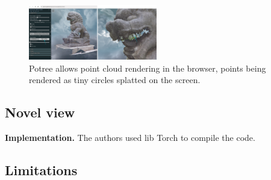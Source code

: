 
\begin{figure}[htbp]
    \centering
    \includegraphics[width=0.5\textwidth]{figures/potree_rendering_and_splat.png}
    \caption{Potree \cite{potree} allows point cloud rendering in the browser, points being rendered as tiny circles splatted on the screen.}
    \label{fig:potree}
\end{figure}



\subsection{Novel view}
\label{subsec:Projecting points}



\noindent\textbf{Implementation.} The authors used lib Torch to compile the code. 




\subsection{Limitations}
\label{subsec:Projecting points}
